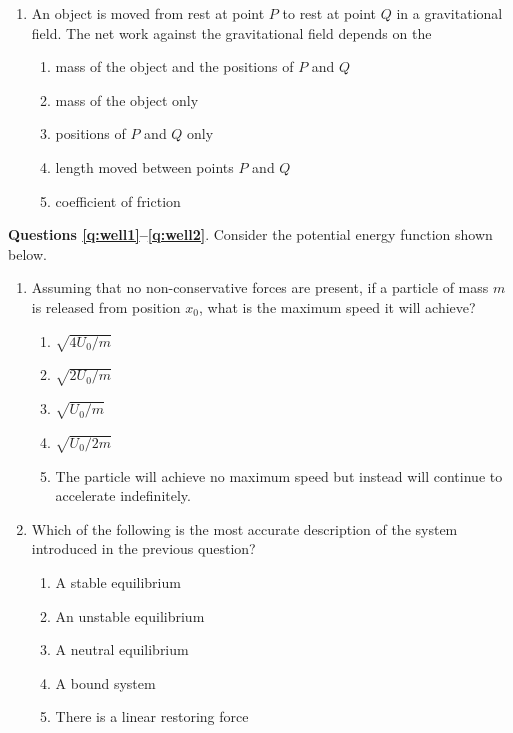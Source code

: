 \documentclass{../../../oss-apphys}
\begin{document}
\begin{multicols}{2}
\begin{enumerate}[leftmargin=18pt,resume]
  \item An object is moved from rest at point $P$ to rest at point $Q$ in a
    gravitational field. The net work against the gravitational field depends
    on the
    \begin{enumerate}[nosep,leftmargin=18pt,label=(\Alph*)]
    \item mass of the object and the positions of $P$ and $Q$
    \item mass of the object only
    \item positions of $P$ and $Q$ only
    \item length moved between points $P$ and $Q$
    \item coefficient of friction
    \end{enumerate}
  \end{enumerate}
  \columnbreak
  
  \textbf{Questions \ref{q:well1}--\ref{q:well2}}. Consider the potential energy
  function shown below.
  \begin{center}
  \end{center}
  \begin{enumerate}[resume,leftmargin=18pt]
  \item Assuming that no non-conservative forces are present, if a particle of
    mass $m$ is released from position $x_0$, what is the maximum speed it will
    achieve?
    \label{q:well1}
    \begin{enumerate}[nosep,leftmargin=18pt,label=(\Alph*)]
    \item $\sqrt{4U_0/m}$
    \item $\sqrt{2U_0/m}$
    \item $\sqrt{U_0/m}$
    \item $\sqrt{U_0/2m}$
    \item The particle will achieve no maximum speed but instead will continue
      to accelerate indefinitely.
    \end{enumerate}
    
  \item Which of the following is the most accurate description of the system
    introduced in the previous question?
    \label{q:well2}
    \begin{enumerate}[nosep,leftmargin=18pt,label=(\Alph*)]
    \item A stable equilibrium
    \item An unstable equilibrium
    \item A neutral equilibrium
    \item A bound system
    \item There is a linear restoring force
    \end{enumerate}
    \columnbreak
    

\end{enumerate}
\end{multicols}
\end{document}
